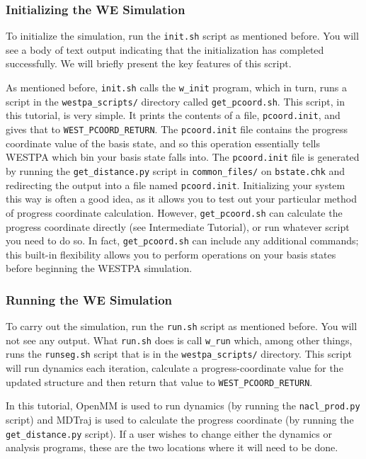 \documentclass[9pt,tutorial,ASAPversion]{livecoms}
\begin{document}
\subsubsection{Initializing the WE Simulation}

To initialize the simulation, run the \verb|init.sh| script as mentioned before. 
You will see a body of text output indicating that the initialization has completed successfully. 
We will briefly present the key features of this script. 

As mentioned before, \verb|init.sh| calls the \verb|w_init| program, which in turn, runs a script in the \verb|westpa_scripts/| directory called \verb|get_pcoord.sh|. 
This script, in this tutorial, is very simple. 
It prints the contents of a file, \verb|pcoord.init|, and gives that to \verb|WEST_PCOORD_RETURN|.
The \verb|pcoord.init| file contains the progress coordinate value of the basis state, and so this operation essentially tells WESTPA which bin your basis state falls into. 
The \verb|pcoord.init| file is generated by running the \verb|get_distance.py| script in \verb|common_files/| on \verb|bstate.chk| and redirecting the output into a file named \verb|pcoord.init|. 
Initializing your system this way is often a good idea, as it allows you to test out your particular method of progress coordinate calculation.  
However, \verb|get_pcoord.sh| can calculate the progress coordinate directly (see Intermediate Tutorial), or run whatever script you need to do so.  
In fact, \verb|get_pcoord.sh| can include any additional commands; this built-in flexibility allows you to perform operations on your basis states before beginning the WESTPA simulation. 

\subsubsection{Running the WE Simulation}

To carry out the simulation, run the \verb|run.sh| script as mentioned before. 
You will not see any output. What \verb|run.sh| does is call \verb|w_run| which, among other things, runs the \verb|runseg.sh| script that is in the \verb|westpa_scripts/| directory. 
This script will run dynamics each iteration, calculate a progress-coordinate value for the updated structure and then return that value to \verb|WEST_PCOORD_RETURN|. 

In this tutorial, OpenMM is used to run dynamics (by running the \verb|nacl_prod.py| script) and MDTraj is used to calculate the progress coordinate (by running the \verb|get_distance.py| script).  
If a user wishes to change either the dynamics or analysis programs, these are the two locations where it will need to be done. 
\end{document}
